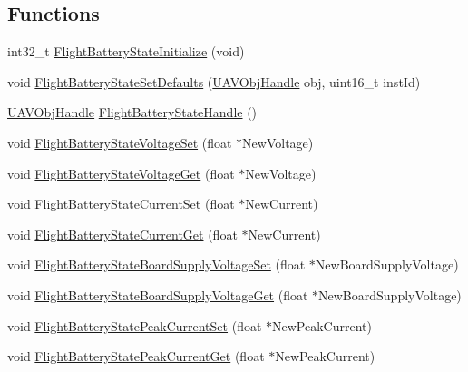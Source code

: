 \subsection*{\-Functions}
\begin{DoxyCompactItemize}
\item 
int32\-\_\-t \hyperlink{group___flight_battery_state_ga1f17339238510cc0539f6b48424808a7}{\-Flight\-Battery\-State\-Initialize} (void)
\item 
void \hyperlink{group___flight_battery_state_ga5e3d83f8999c38f1385751f30e25f9ad}{\-Flight\-Battery\-State\-Set\-Defaults} (\hyperlink{targets_2_u_a_v_objects_2inc_2uavobjectmanager_8h_a279053e22be53ce9f895043aaeb91e3b}{\-U\-A\-V\-Obj\-Handle} obj, uint16\-\_\-t inst\-Id)
\item 
\hyperlink{targets_2_u_a_v_objects_2inc_2uavobjectmanager_8h_a279053e22be53ce9f895043aaeb91e3b}{\-U\-A\-V\-Obj\-Handle} \hyperlink{group___flight_battery_state_gaebd59a815fdaeebadbdf7d288286a5e2}{\-Flight\-Battery\-State\-Handle} ()
\item 
void \hyperlink{group___flight_battery_state_gaf657e8e97139107b771e78fa136717f0}{\-Flight\-Battery\-State\-Voltage\-Set} (float $\ast$\-New\-Voltage)
\item 
void \hyperlink{group___flight_battery_state_ga108b0ae5290dd0d5f4b57394aef426ef}{\-Flight\-Battery\-State\-Voltage\-Get} (float $\ast$\-New\-Voltage)
\item 
void \hyperlink{group___flight_battery_state_ga71f9ff0366039dc2dd42b386b8ed8381}{\-Flight\-Battery\-State\-Current\-Set} (float $\ast$\-New\-Current)
\item 
void \hyperlink{group___flight_battery_state_ga5d43dedad9728efa37f2a14873e8a1cc}{\-Flight\-Battery\-State\-Current\-Get} (float $\ast$\-New\-Current)
\item 
void \hyperlink{group___flight_battery_state_gaab8caecf4ab07070159d11137b00f009}{\-Flight\-Battery\-State\-Board\-Supply\-Voltage\-Set} (float $\ast$\-New\-Board\-Supply\-Voltage)
\item 
void \hyperlink{group___flight_battery_state_ga48fefc9d8cee82ee31fc273fb9581eaf}{\-Flight\-Battery\-State\-Board\-Supply\-Voltage\-Get} (float $\ast$\-New\-Board\-Supply\-Voltage)
\item 
void \hyperlink{group___flight_battery_state_ga0f9cceeca561cd1a15d727351a2ac721}{\-Flight\-Battery\-State\-Peak\-Current\-Set} (float $\ast$\-New\-Peak\-Current)
\item 
void \hyperlink{group___flight_battery_state_ga08aa5fbe643d68952d05615e0e43fb6c}{\-Flight\-Battery\-State\-Peak\-Current\-Get} (float $\ast$\-New\-Peak\-Current)

\end{DoxyCompactItemize}
